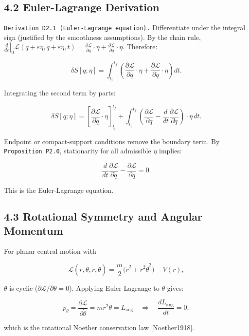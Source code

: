 \documentclass[
]{article}
\begin{document}
\subsection{4.2 Euler-Lagrange
Derivation}\label{euler-lagrange-derivation}

\texttt{Derivation\ D2.1\ (Euler-Lagrange\ equation).} Differentiate
under the integral sign (justified by the smoothness assumptions). By
the chain rule,
\(\left.\frac{d}{d\varepsilon}\right|_{0}\mathcal L(q+\varepsilon\eta,\dot q+\varepsilon\dot\eta,t)
=\frac{\partial\mathcal L}{\partial q}\cdot\eta+\frac{\partial\mathcal L}{\partial\dot q}\cdot\dot\eta\).
Therefore:

\[
\delta S[q;\eta]
=\int_{t_i}^{t_f}
\left(
\frac{\partial\mathcal L}{\partial q}\cdot\eta
+
\frac{\partial\mathcal L}{\partial \dot q}\cdot\dot\eta
\right)dt.
\]

Integrating the second term by parts:

\[
\delta S[q;\eta]
=
\left[
\frac{\partial\mathcal L}{\partial\dot q}\cdot\eta
\right]_{t_i}^{t_f}
+
\int_{t_i}^{t_f}
\left(
\frac{\partial\mathcal L}{\partial q}
-\frac{d}{dt}\frac{\partial\mathcal L}{\partial\dot q}
\right)\cdot\eta\,dt.
\]

Endpoint or compact-support conditions remove the boundary term. By
\texttt{Proposition\ P2.0}, stationarity for all admissible \(\eta\)
implies:

\[
\frac{d}{dt}\frac{\partial\mathcal L}{\partial\dot q}
-\frac{\partial\mathcal L}{\partial q}
=0.
\]

This is the Euler-Lagrange equation.

\subsection{4.3 Rotational Symmetry and Angular
Momentum}\label{rotational-symmetry-and-angular-momentum}

For planar central motion with

\[
\mathcal L(r,\theta,\dot r,\dot\theta)=
\frac{m}{2}\big(\dot r^2+r^2\dot\theta^2\big)-V(r),
\]

\(\theta\) is cyclic (\(\partial\mathcal L/\partial\theta=0\)). Applying
Euler-Lagrange to \(\theta\) gives:

\[
p_\theta=\frac{\partial\mathcal L}{\partial\dot\theta}=m r^2\dot\theta
=L_{\mathrm{ang}}
\quad\Rightarrow\quad
\frac{dL_{\mathrm{ang}}}{dt}=0,
\]

which is the rotational Noether conservation law {[}Noether1918{]}.
\end{document}
